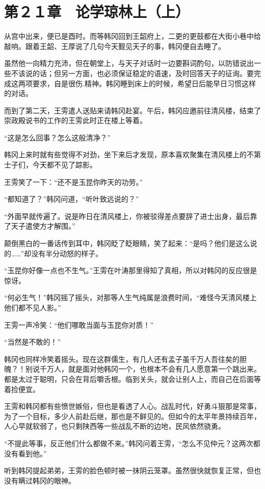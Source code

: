 \section{第２１章　论学琼林上（上）}

从宫中出来，便已是酉时。而等韩冈回到王韶府上，二更的更鼓都在大街小巷中给敲响。跟着王韶、王厚说了几句今天觐见天子的事，韩冈便自去睡了。

虽然他一向精力充沛，但在朝堂上，与天子对话时一边要斟词酌句，以防错说出一些不该说的话；但另一方面，也必须保证稳定的语速，及时回答天子的征询。要完成这两项要求，自是很伤.精神。韩冈睡到床上的时候，希望日后能早日习惯这样的对话。

而到了第二天，王雱遣人送贴来请韩冈赴宴。午后，韩冈应邀前往清风楼，结束了崇政殿说书的工作的王雱此时正在楼上等着。

“这是怎么回事？怎么这般清净？”

韩冈上来时就有些觉得不对劲，坐下来后才发现，原本喜欢聚集在清风楼上的不第士子们，今天都不见了踪影。

王雱笑了一下：“还不是玉昆你昨天的功劳。”

“都知道了？”韩冈问道，“听叶致远说的？”

“外面早就传遍了。说是昨日在清风楼上，你被驳得差点要辞了进士出身，最后靠了天子遣使方才解围。”

颠倒黑白的一番话传到耳中，韩冈眨了眨眼睛，笑了起来：“是吗？他们是这么说的……”却没有半分动怒的样子。

“玉昆你好像一点也不生气。”王雱在叶涛那里得知了真相，所以对韩冈的反应很是惊讶。

“何必生气！”韩冈摇了摇头，对那等人生气纯属是浪费时间，“难怪今天清风楼上他们都不见人影。”

王雱一声冷笑：“他们哪敢当面与玉昆你对质！”

“当然是不敢的！”

韩冈也同样冷笑着摇头。现在这群儒生，有几人还有孟子虽千万人吾往矣的胆魄？！别说千万人，就是面对他韩冈一个，也根本不会有几人愿意第一个跳出来。都是太过于聪明，只会在背后嚼舌根。临到关头，就会让别人上，而自己在后面等着捡便宜。

王雱和韩冈都有些愤世嫉俗，但也是看透了人心。战乱时代，好勇斗狠那是常事，为了一个目标，多少人前赴后继，那也是不鲜见的。但如今的太平年景持续百年，人心早就软弱了，也只剩陕西等一些战乱不断的边地，民风依然骁勇。

“不提此等事，反正他们什么都做不来。”韩冈问着王雱，“怎么不见仲元？这两次都没有看到他。”

听到韩冈提起弟弟，王雱的脸色顿时被一抹阴云笼罩。虽然很快就恢复正常，但也没有瞒过韩冈的眼神。

